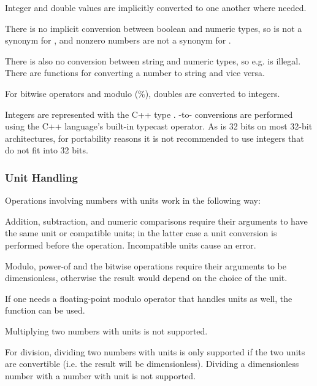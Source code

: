 Integer and double values are implicitly converted to one another where needed.

There is no implicit conversion between boolean and numeric types, so 
is not a synonym for , and nonzero numbers are not a synonym
for .

There is also no conversion between string and numeric types, so e.g. 
is illegal. There are functions for converting a number to string and vice versa.

For bitwise operators and modulo (\%), doubles are converted to integers.

\begin{note}
Integers are represented with the C++ type . -to-
conversions are performed using the C++ language's built-in typecast operator.
As  is 32 bits on most 32-bit architectures, for portability reasons
it is not recommended to use integers that do not fit into 32 bits.
\end{note}


\subsubsection{Unit Handling}
\label{sec:ned-ref:unit-handling}

Operations involving numbers with units work in the following way:

Addition, subtraction, and numeric comparisons require their arguments to
have the same unit or compatible units; in the latter case a unit conversion
is performed before the operation. Incompatible units cause an error.


Modulo, power-of and the bitwise operations require their arguments to be
dimensionless, otherwise the result would depend on the choice of the unit.

\begin{note}
If one needs a floating-point modulo operator that handles units as well,
the  function can be used.
\end{note}

Multiplying two numbers with units is not supported.

For division, dividing two numbers with units is only supported if the two
units are convertible (i.e. the result will be dimensionless). Dividing
a dimensionless number with a number with unit is not supported.



